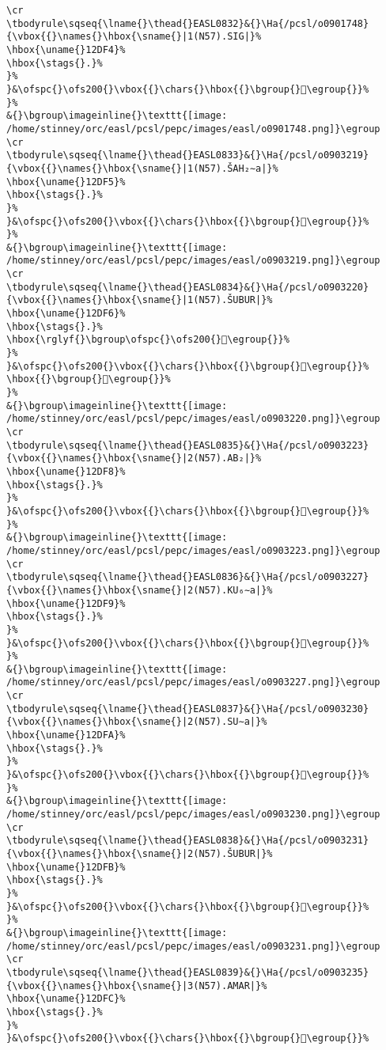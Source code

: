 \begin{verbatim}
\cr
\tbodyrule\sqseq{\lname{}\thead{}EASL0832}&{}\Ha{/pcsl/o0901748}{\vbox{{}\names{}\hbox{\sname{}|1(N57).SIG|}%
\hbox{\uname{}12DF4}%
\hbox{\stags{}.}%
}%
}&\ofspc{}\ofs200{}\vbox{{}\chars{}\hbox{{}\bgroup{}𒷴\egroup{}}%
}%
&{}\bgroup\imageinline{}\texttt{[image: /home/stinney/orc/easl/pcsl/pepc/images/easl/o0901748.png]}\egroup
\cr
\tbodyrule\sqseq{\lname{}\thead{}EASL0833}&{}\Ha{/pcsl/o0903219}{\vbox{{}\names{}\hbox{\sname{}|1(N57).ŠAH₂∼a|}%
\hbox{\uname{}12DF5}%
\hbox{\stags{}.}%
}%
}&\ofspc{}\ofs200{}\vbox{{}\chars{}\hbox{{}\bgroup{}𒷵\egroup{}}%
}%
&{}\bgroup\imageinline{}\texttt{[image: /home/stinney/orc/easl/pcsl/pepc/images/easl/o0903219.png]}\egroup
\cr
\tbodyrule\sqseq{\lname{}\thead{}EASL0834}&{}\Ha{/pcsl/o0903220}{\vbox{{}\names{}\hbox{\sname{}|1(N57).ŠUBUR|}%
\hbox{\uname{}12DF6}%
\hbox{\stags{}.}%
\hbox{\rglyf{}\bgroup\ofspc{}\ofs200{}𒷶\egroup{}}%
}%
}&\ofspc{}\ofs200{}\vbox{{}\chars{}\hbox{{}\bgroup{}𒷷\egroup{}}%
\hbox{{}\bgroup{}𒷶\egroup{}}%
}%
&{}\bgroup\imageinline{}\texttt{[image: /home/stinney/orc/easl/pcsl/pepc/images/easl/o0903220.png]}\egroup
\cr
\tbodyrule\sqseq{\lname{}\thead{}EASL0835}&{}\Ha{/pcsl/o0903223}{\vbox{{}\names{}\hbox{\sname{}|2(N57).AB₂|}%
\hbox{\uname{}12DF8}%
\hbox{\stags{}.}%
}%
}&\ofspc{}\ofs200{}\vbox{{}\chars{}\hbox{{}\bgroup{}𒷸\egroup{}}%
}%
&{}\bgroup\imageinline{}\texttt{[image: /home/stinney/orc/easl/pcsl/pepc/images/easl/o0903223.png]}\egroup
\cr
\tbodyrule\sqseq{\lname{}\thead{}EASL0836}&{}\Ha{/pcsl/o0903227}{\vbox{{}\names{}\hbox{\sname{}|2(N57).KU₆∼a|}%
\hbox{\uname{}12DF9}%
\hbox{\stags{}.}%
}%
}&\ofspc{}\ofs200{}\vbox{{}\chars{}\hbox{{}\bgroup{}𒷹\egroup{}}%
}%
&{}\bgroup\imageinline{}\texttt{[image: /home/stinney/orc/easl/pcsl/pepc/images/easl/o0903227.png]}\egroup
\cr
\tbodyrule\sqseq{\lname{}\thead{}EASL0837}&{}\Ha{/pcsl/o0903230}{\vbox{{}\names{}\hbox{\sname{}|2(N57).SU∼a|}%
\hbox{\uname{}12DFA}%
\hbox{\stags{}.}%
}%
}&\ofspc{}\ofs200{}\vbox{{}\chars{}\hbox{{}\bgroup{}𒷺\egroup{}}%
}%
&{}\bgroup\imageinline{}\texttt{[image: /home/stinney/orc/easl/pcsl/pepc/images/easl/o0903230.png]}\egroup
\cr
\tbodyrule\sqseq{\lname{}\thead{}EASL0838}&{}\Ha{/pcsl/o0903231}{\vbox{{}\names{}\hbox{\sname{}|2(N57).ŠUBUR|}%
\hbox{\uname{}12DFB}%
\hbox{\stags{}.}%
}%
}&\ofspc{}\ofs200{}\vbox{{}\chars{}\hbox{{}\bgroup{}𒷻\egroup{}}%
}%
&{}\bgroup\imageinline{}\texttt{[image: /home/stinney/orc/easl/pcsl/pepc/images/easl/o0903231.png]}\egroup
\cr
\tbodyrule\sqseq{\lname{}\thead{}EASL0839}&{}\Ha{/pcsl/o0903235}{\vbox{{}\names{}\hbox{\sname{}|3(N57).AMAR|}%
\hbox{\uname{}12DFC}%
\hbox{\stags{}.}%
}%
}&\ofspc{}\ofs200{}\vbox{{}\chars{}\hbox{{}\bgroup{}𒷼\egroup{}}%

\end{verbatim}
